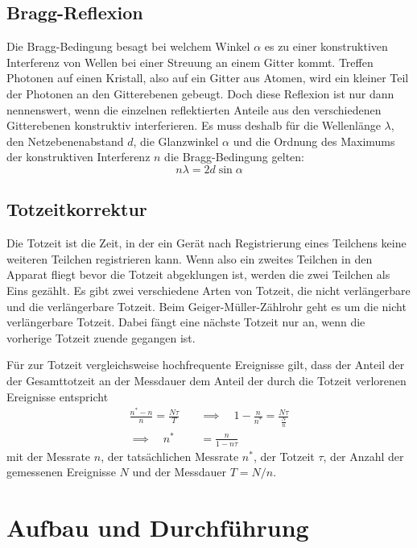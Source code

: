 \documentclass[titlepage = firstcover]{scrartcl}
\begin{document}
      \subsection{Bragg-Reflexion}
        Die Bragg-Bedingung besagt bei welchem Winkel $\alpha$ es zu einer konstruktiven Interferenz von Wellen bei einer Streuung an einem Gitter kommt. Treffen Photonen auf einen Kristall, also auf ein Gitter aus Atomen, wird ein kleiner Teil der Photonen an den Gitterebenen gebeugt. Doch diese Reflexion ist nur dann nennenswert, wenn die einzelnen reflektierten Anteile aus den verschiedenen Gitterebenen konstruktiv interferieren. Es muss deshalb für die Wellenlänge $\lambda$, den Netzebenenabstand $d$, die Glanzwinkel $\alpha$ und die Ordnung des Maximums der konstruktiven Interferenz $n$ die Bragg-Bedingung gelten:
        \begin{equation}
          n \lambda = 2 d \sin{\alpha}
          \label{eqn:bragg}
        \end{equation}

      \subsection{Totzeitkorrektur}
        Die Totzeit ist die Zeit, in der ein Gerät nach Registrierung eines Teilchens keine weiteren Teilchen registrieren kann. Wenn also ein zweites Teilchen in den Apparat fliegt bevor die Totzeit abgeklungen ist, werden die zwei Teilchen als Eins gezählt.
        Es gibt zwei verschiedene Arten von Totzeit, die nicht verlängerbare und die verlängerbare Totzeit.
        Beim Geiger-Müller-Zählrohr geht es um die nicht verlängerbare Totzeit. Dabei fängt eine nächste Totzeit nur an, wenn die vorherige Totzeit zuende gegangen ist.

        Für zur Totzeit vergleichsweise hochfrequente Ereignisse gilt, dass der Anteil der der Gesamttotzeit an der Messdauer dem Anteil der durch die Totzeit verlorenen Ereignisse entspricht
        \begin{align}
          \frac{n^* - n}{n} = \frac{N\tau}{T} \quad & \implies \quad 1 - \frac{n}{n^*} = \frac{N\tau}{\frac{N}{n}} \\
          \implies \quad n^* & = \frac{n}{1 - n\tau}
          \label{eqn:totzeitkorrektur}
        \end{align}
        mit der Messrate $n$, der tatsächlichen Messrate $n^*$, der Totzeit $\tau$, der Anzahl der gemessenen Ereignisse $N$ und der Messdauer $T = N / n$.

      \section{Aufbau und Durchführung}
\end{document}
